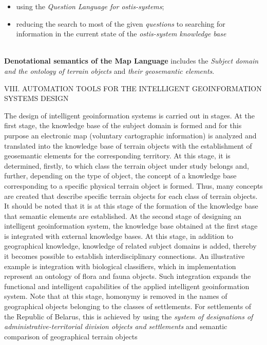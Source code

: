 \documentclass{article}
\begin{document}
\begin{multicols}{2}
\begin{itemize}
		\item using the \textit{Question Language for ostis-systems};
	
		\item  reducing the search to most of the given \textit{questions}
to searching for information in the current state of
the \textit{ostis-system knowledge base}
	\end{itemize}
\ \\  

  \textbf{Denotational semantics of the Map Language} includes
the \textit{Subject domain and the ontology of terrain objects}
and \textit{their geosemantic elements}.
\begin{center}
VIII. AUTOMATION TOOLS FOR THE INTELLIGENT
GEOINFORMATION SYSTEMS DESIGN
\end{center}
The design of intelligent geoinformation systems is
carried out in stages. At the first stage, the knowledge
base of the subject domain is formed and for this purpose
an electronic map (voluntary cartographic information)
is analyzed and translated into the knowledge base of
terrain objects with the establishment of geosemantic
elements for the corresponding territory. At this stage, it
is determined, firstly, to which class the terrain object
under study belongs and, further, depending on the type
of object, the concept of a knowledge base corresponding
to a specific physical terrain object is formed. Thus, many
concepts are created that describe specific terrain objects
for each class of terrain objects. It should be noted that
it is at this stage of the formation of the knowledge base
that semantic elements are established. At the second
stage of designing an intelligent geoinformation system,
the knowledge base obtained at the first stage is integrated
with external knowledge bases. At this stage, in addition
to geographical knowledge, knowledge of related subject
domains is added, thereby it becomes possible to establish
interdisciplinary connections. An illustrative example is
integration with biological classifiers, which in implementation represent an ontology of flora and fauna objects.
Such integration expands the functional and intelligent
capabilities of the applied intelligent geoinformation
system. Note that at this stage, homonymy is removed in
the names of geographical objects belonging to the classes
of settlements. For settlements of the Republic of Belarus,
this is achieved by using the \textit{system of designations of
administrative-territorial division objects and settlements}
and semantic comparison of geographical terrain objects

\end{multicols}
\end{document}
